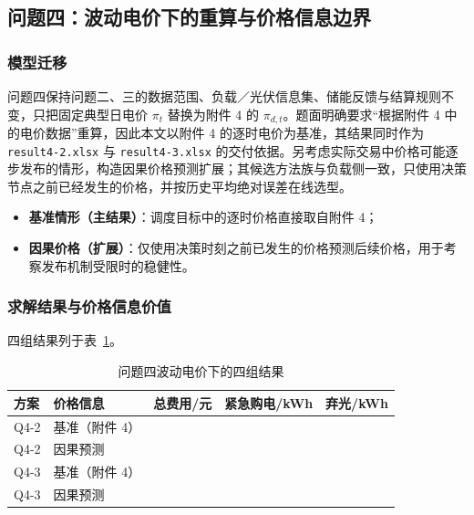 \subsection{问题四：波动电价下的重算与价格信息边界}

\subsubsection{模型迁移}

问题四保持问题二、三的数据范围、负载／光伏信息集、储能反馈与结算规则不变，只把固定典型日电价 $\pi_t$ 替换为附件 4 的 $\pi_{d,t}$。题面明确要求“根据附件 4 中的电价数据”重算，因此本文以附件 4 的逐时电价为基准，其结果同时作为 \texttt{result4-2.xlsx} 与 \texttt{result4-3.xlsx} 的交付依据。另考虑实际交易中价格可能逐步发布的情形，构造因果价格预测扩展；其候选方法族与负载侧一致，只使用决策节点之前已经发生的价格，并按历史平均绝对误差在线选型。

\begin{itemize}[itemsep=1pt, topsep=2pt]
	\item \textbf{基准情形（主结果）}：调度目标中的逐时价格直接取自附件 4；
	\item \textbf{因果价格（扩展）}：仅使用决策时刻之前已发生的价格预测后续价格，用于考察发布机制受限时的稳健性。
\end{itemize}

\subsubsection{求解结果与价格信息价值}

四组结果列于表~\ref{tab:q4-result}。

\begin{table}[htbp]
	\caption{问题四波动电价下的四组结果}
	\label{tab:q4-result}
	\centering
	\begin{tabular}{l l r r r}
		\toprule
		方案 & 价格信息 & 总费用/元 & 紧急购电/kWh & 弃光/kWh \\
		\midrule
		Q4-2 & 基准（附件 4） & \QfourTwoPerfect & \QfourTwoPerfectEm & \QfourTwoPerfectCurtail \\
		Q4-2 & 因果预测 & \QfourTwoCausal & \QfourTwoCausalEm & \QfourTwoCausalCurtail \\
		Q4-3 & 基准（附件 4） & \QfourThreePerfect & \QfourThreePerfectEm & \QfourThreePerfectCurtail \\
		Q4-3 & 因果预测 & \QfourThreeCausal & \QfourThreeCausalEm & \QfourThreeCausalCurtail \\
		\bottomrule
	\end{tabular}
\end{table}

